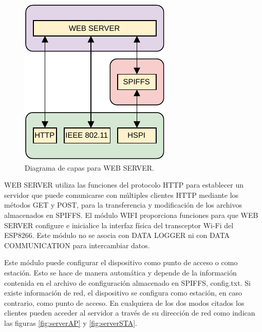 \begin{figure}[h]
	\centering
	\includegraphics[scale=1]{./Figures/web_server_diagram.pdf}
	\caption{Diagrama de capas para WEB SERVER.}
		\label{fig:serverDiagram}
\end{figure}

WEB SERVER utiliza las funciones del protocolo HTTP para establecer un servidor que puede comunicarse con múltiples clientes HTTP mediante los métodos GET y POST, para la transferencia y modificación de los archivos almacenados en SPIFFS. El módulo WIFI proporciona funciones para que WEB SERVER configure e inicialice la interfaz física del transceptor Wi-Fi del ESP8266. Este módulo no se asocia con DATA LOGGER ni con DATA COMMUNICATION para intercambiar datos.

Este módulo puede configurar el dispositivo como punto de acceso o como estación. Esto se hace de manera automática y depende de la información contenida en el archivo de configuración almacenado en SPIFFS, config.txt. Si existe información de red, el dispositivo se configura como estación, en caso contrario, como punto de acceso. En cualquiera de los dos modos citados los clientes pueden acceder al servidor a través de su dirección de red como indican las figuras \ref{fig:serverAP} y \ref{fig:serverSTA}.                                                                                                                                                                                                                                                                                                                                                                                                                                                                                                                                                                                                                                                                                                                                                                                                                                                                                                                                                                                                                                                                          

